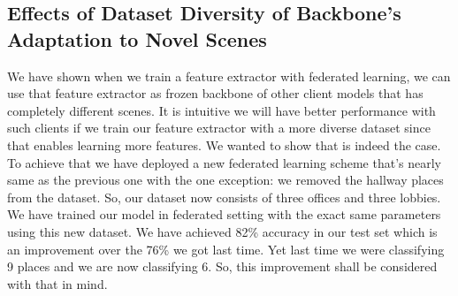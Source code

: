 \documentclass[11pt]{article}
\begin{document}
\subsection{Effects of Dataset Diversity of Backbone's Adaptation to Novel Scenes}

	We have shown when we train a feature extractor with federated learning, we can use that feature extractor as frozen backbone of other client models that has completely different scenes. It is intuitive we will have better performance with such clients if we train our feature extractor with a more diverse dataset since that enables learning more features. We wanted to show that is indeed the case. To achieve that we have deployed a new federated learning scheme that’s nearly same as the previous one with the one exception: we removed the hallway places from the dataset. So, our dataset now consists of three offices and three lobbies. We have trained our model in federated setting with the exact same parameters using this new dataset. We have achieved 82\% accuracy in our test set which is an improvement over the 76\% we got last time. Yet last time we were classifying 9 places and we are now classifying 6. So, this improvement shall be considered with that in mind.
	
\end{document}
